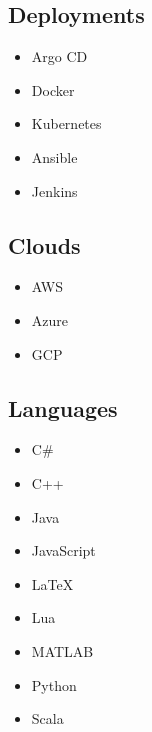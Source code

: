 \documentclass[letterpaper]{resume}
\begin{document}
\begin{minipage}[t]{0.27\textwidth}

\subsection{Deployments}
\begin{itemize}
\item Argo CD
\item Docker
\item Kubernetes
\end{itemize}

\begin{itemize}
\item Ansible
\item Jenkins
\end{itemize}

\sectionspace %


\subsection{Clouds}
\begin{itemize}
\item AWS
\item Azure
\item GCP
\end{itemize}

\sectionspace %


\subsection{Languages}
\begin{itemize}
\item C\#
\item C++
\item Java
\item JavaScript
\item \LaTeX
\item Lua
\item MATLAB
\item Python
\item Scala
\end{itemize}

\sectionspace %


\end{minipage}
\end{document}
